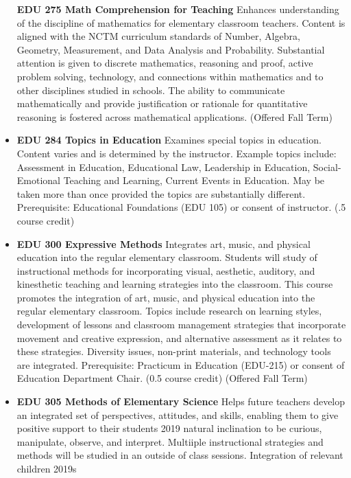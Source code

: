 \documentclass[
  letterpaper,
]{scrbook}
\begin{document}
\begin{itemize}
  \textbf{EDU 275 Math Comprehension for Teaching} Enhances
  understanding of the discipline of mathematics for elementary
  classroom teachers. Content is aligned with the NCTM curriculum
  standards of Number, Algebra, Geometry, Measurement, and Data Analysis
  and Probability. Substantial attention is given to discrete
  mathematics, reasoning and proof, active problem solving, technology,
  and connections within mathematics and to other disciplines studied in
  schools. The ability to communicate mathematically and provide
  justification or rationale for quantitative reasoning is fostered
  across mathematical applications. (Offered Fall Term)\\
\item
  \textbf{EDU 284 Topics in Education} Examines special topics in
  education. Content varies and is determined by the instructor. Example
  topics include: Assessment in Education, Educational Law, Leadership
  in Education, Social-Emotional Teaching and Learning, Current Events
  in Education. May be taken more than once provided the topics are
  substantially different. Prerequisite: Educational Foundations (EDU
  105) or consent of instructor. (.5 course credit)\\
\item
  \textbf{EDU 300 Expressive Methods} Integrates art, music, and
  physical education into the regular elementary classroom. Students
  will study of instructional methods for incorporating visual,
  aesthetic, auditory, and kinesthetic teaching and learning strategies
  into the classroom. This course promotes the integration of art,
  music, and physical education into the regular elementary classroom.
  Topics include research on learning styles, development of lessons and
  classroom management strategies that incorporate movement and creative
  expression, and alternative assessment as it relates to these
  strategies. Diversity issues, non-print materials, and technology
  tools are integrated. Prerequisite: Practicum in Education (EDU-215)
  or consent of Education Department Chair. (0.5 course credit) (Offered
  Fall Term)\\
\item
  \textbf{EDU 305 Methods of Elementary Science} Helps future teachers
  develop an integrated set of perspectives, attitudes, and skills,
  enabling them to give positive support to their students 2019 natural
  inclination to be curious, manipulate, observe, and interpret.
  Multiiple instructional strategies and methods will be studied in an
  outside of class sessions. Integration of relevant children 2019s

\end{itemize}
\end{document}
